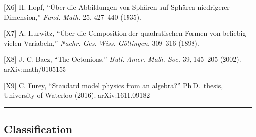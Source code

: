 \documentclass[
  a4paper,
]{article}
\begin{document}
{[}X6{]} H. Hopf, ``Über die Abbildungen von Sphären auf Sphären
niedrigerer Dimension,'' \emph{Fund. Math.} 25, 427--440 (1935).

{[}X7{]} A. Hurwitz, ``Über die Composition der quadratischen Formen von
beliebig vielen Variabeln,'' \emph{Nachr. Ges. Wiss. Göttingen},
309--316 (1898).

{[}X8{]} J. C. Baez, ``The Octonions,'' \emph{Bull. Amer. Math. Soc.}
39, 145--205 (2002). arXiv:math/0105155

{[}X9{]} C. Furey, ``Standard model physics from an algebra?''
Ph.D.~thesis, University of Waterloo (2016). arXiv:1611.09182

\begin{center}\rule{0.5\linewidth}{0.5pt}\end{center}

\subsection{Classification}\label{classification}
\end{document}
